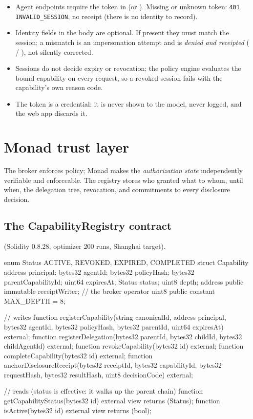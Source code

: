 \documentclass[11pt,a4paper]{article}
\begin{document}
\begin{itemize}
  \item Agent endpoints require the token in  (or ). Missing or unknown token: \texttt{401 INVALID\_SESSION}, no receipt (there is no identity to record).
  \item Identity fields in the body are optional. If present they must match the session; a mismatch is an impersonation attempt and is \emph{denied and receipted} ( / ), not silently corrected.
  \item Sessions do not decide expiry or revocation; the policy engine evaluates the bound capability on every request, so a revoked session fails with the capability's own reason code.
  \item The token is a credential: it is never shown to the model, never logged, and the web app discards it.
\end{itemize}

\section{Monad trust layer}\label{sec:chain}

The broker enforces policy; Monad makes the \emph{authorization state} independently verifiable and enforceable. The registry stores who granted what to whom, until when, the delegation tree, revocation, and commitments to every disclosure decision.

\subsection{The CapabilityRegistry contract}
 (Solidity 0.8.28, optimizer 200 runs, Shanghai target).

\begin{codebox}[language=solidity]
enum Status { ACTIVE, REVOKED, EXPIRED, COMPLETED }
struct Capability {
    address principal;   bytes32 agentId;   bytes32 policyHash;
    bytes32 parentCapabilityId;   uint64 expiresAt;   Status status;   uint8 depth;
}
address public immutable receiptWriter;   // the broker operator
uint8 public constant MAX_DEPTH = 8;

// writes
function registerCapability(string canonicalId, address principal, bytes32 agentId,
    bytes32 policyHash, bytes32 parentId, uint64 expiresAt) external;
function registerDelegation(bytes32 parentId, bytes32 childId, bytes32 childAgentId) external;
function revokeCapability(bytes32 id) external;
function completeCapability(bytes32 id) external;
function anchorDisclosureReceipt(bytes32 receiptId, bytes32 capabilityId,
    bytes32 requestHash, bytes32 resultHash, uint8 decisionCode) external;

// reads (status is effective: it walks up the parent chain)
function getCapabilityStatus(bytes32 id) external view returns (Status);
function isActive(bytes32 id) external view returns (bool);
\end{codebox}
\end{document}

